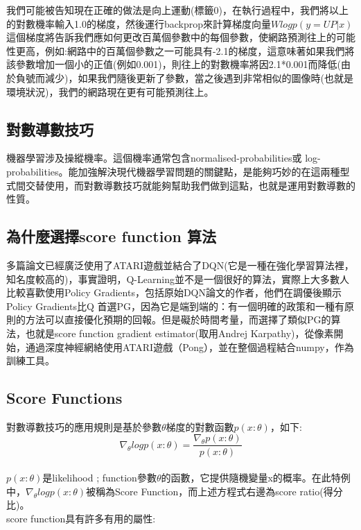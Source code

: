 \documentclass[14pt,a4paper]{report}  %
\begin{document}
我們可能被告知現在正確的做法是向上運動(標籤0)，在執行過程中，我們將以上的對數機率輸入1.0的梯度，然後運行backprop來計算梯度向量$Wlogp(y=UP|x)$這個梯度將告訴我們應如何更改百萬個參數中的每個參數，使網路預測往上的可能性更高，例如:網路中的百萬個參數之一可能具有-2.1的梯度，這意味著如果我們將該參數增加一個小的正值(例如0.001)，則往上的對數機率將因2.1*0.001而降低(由於負號而減少)，如果我們隨後更新了參數，當之後遇到非常相似的圖像時(也就是環境狀況)，我們的網路現在更有可能預測往上。\\

\subsection{對數導數技巧}
 機器學習涉及操縱機率。這個機率通常包含normalised-probabilities或 log-probabilities。能加強解決現代機器學習問題的關鍵點，是能夠巧妙的在這兩種型式間交替使用，而對數導數技巧就能夠幫助我們做到這點，也就是運用對數導數的性質。\\
\subsection{為什麼選擇score function 算法}
 多篇論文已經廣泛使用了ATARI遊戲並結合了DQN(它是一種在強化學習算法裡，知名度較高的)，事實證明，Q-Learning並不是一個很好的算法，實際上大多數人比較喜歡使用Policy Gradients，包括原始DQN論文的作者，他們在調優後顯示Policy Gradients比Q 首選PG，因為它是端到端的：有一個明確的政策和一種有原則的方法可以直接優化預期的回報。但是礙於時間考量，而選擇了類似PG的算法，也就是score function gradient estimator(取用Andrej Karpathy)，從像素開始，通過深度神經網絡使用ATARI遊戲（Pong），並在整個過程結合numpy，作為訓練工具。\\ 
\subsection{Score Functions}
 對數導數技巧的應用規則是基於參數$\theta$梯度的對數函數$p(x:\theta)$，如下:\\
$$\nabla_\theta logp(x:\theta)=\frac{\nabla_\theta p(x:\theta)}{p(x:\theta)}$$\\
$p(x:\theta)$是likelihood ; function參數$\theta$的函數，它提供隨機變量x的概率。在此特例中，$\nabla_\theta logp(x:\theta)$被稱為Score Function，而上述方程式右邊為score ratio(得分比)。\\
score function具有許多有用的屬性:\\
\end{document}
